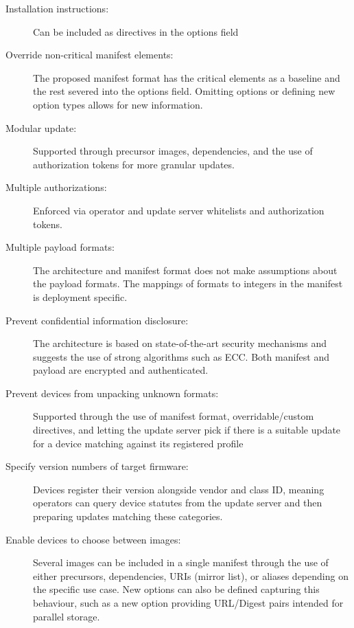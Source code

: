 \documentclass[0-thesis.tex]{subfiles}
\begin{document}
\begin{description}
    \item[Installation instructions:]
        Can be included as directives in the options field
    \item[Override non-critical manifest elements:]
        The proposed manifest format has the critical elements as a baseline and the rest
        severed into the options field. Omitting options or defining new option types
        allows for new information.
    \item[Modular update:]
        Supported through precursor images, dependencies, and the use of authorization
        tokens for more granular updates.

    \item[Multiple authorizations:]
        Enforced via operator and update server whitelists and authorization tokens.

    \item[Multiple payload formats:]
        The architecture and manifest format does not make assumptions about the payload
        formats. The mappings of formats to integers in the manifest is deployment
        specific.

    \item[Prevent confidential information disclosure:]
        The architecture is based on state-of-the-art security mechanisms and suggests the
        use of strong algorithms such as ECC. Both manifest and payload are encrypted and
        authenticated.

    \item[Prevent devices from unpacking unknown formats:]
        Supported through the use of manifest format, overridable/custom directives, and
        letting the update server pick if there is a suitable update for a device matching
        against its registered profile

    \item[Specify version numbers of target firmware:]
        Devices register their version alongside vendor and class ID, meaning operators
        can query device statutes from the update server and then preparing updates
        matching these categories.

    \item[Enable devices to choose between images:]
        Several images can be included in a single manifest through the use of either
        precursors, dependencies, URIs (mirror list), or aliases depending on the specific
        use case. New options can also be defined capturing this behaviour, such as a new
        option providing URL/Digest pairs intended for parallel storage.


\end{description}
\end{document}
